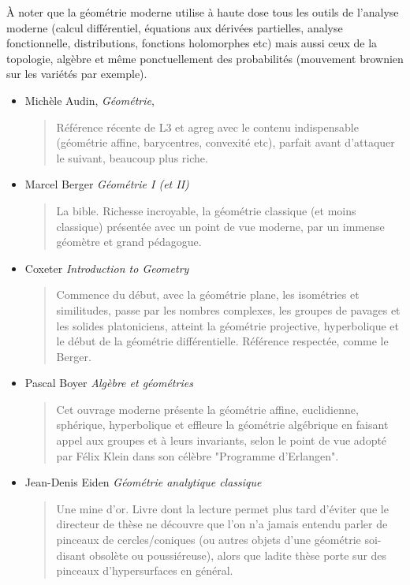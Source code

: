 \documentclass{article}
\begin{document}
À noter que la géométrie moderne utilise à haute dose tous les outils de l'analyse moderne (calcul différentiel, équations aux dérivées partielles, analyse fonctionnelle, distributions, fonctions holomorphes etc) mais aussi ceux de la topologie, algèbre et même ponctuellement des probabilités (mouvement brownien sur les variétés par exemple).
\begin{mdframed}
\begin{itemize}
\item  Michèle Audin, \emph{Géométrie}, 
\begin{quote}
Référence récente de L3 et agreg avec le contenu indispensable (géométrie affine, barycentres, convexité etc), parfait avant d'attaquer le suivant, beaucoup plus riche.
\end{quote}
\end{itemize}
\end{mdframed}
\begin{itemize}
\item Marcel Berger \emph{Géométrie I (et II)}
\begin{quote}
La bible. Richesse incroyable, la géométrie classique (et moins classique) présentée avec un point de vue moderne, par un immense géomètre et grand pédagogue.
\end{quote}
\item Coxeter \emph{Introduction to Geometry}
\begin{quote}
Commence du début, avec la géométrie plane, les isométries et similitudes, passe par les nombres complexes, les groupes de pavages et les solides platoniciens, atteint la géométrie projective, hyperbolique et le début de la géométrie différentielle. Référence respectée, comme le Berger.
\end{quote}
\item Pascal Boyer \emph{Algèbre et géométries}
\begin{quote}
Cet ouvrage moderne présente la géométrie affine, euclidienne, sphérique, hyperbolique et effleure la géométrie algébrique  en faisant appel aux groupes et à leurs invariants, selon le point de vue adopté par Félix Klein dans son célèbre "Programme d'Erlangen".
\end{quote}
\item Jean-Denis Eiden \emph{Géométrie analytique classique}
\begin{quote}
Une mine d'or. Livre dont la lecture permet plus tard d'éviter que le directeur de thèse ne découvre que l'on n'a jamais entendu parler de  pinceaux de cercles/coniques (ou autres objets d'une géométrie soi-disant obsolète ou \og poussiéreuse\fg), alors que ladite thèse porte sur des pinceaux d'hypersurfaces en général.
\end{quote}
\end{itemize}
\end{document}
